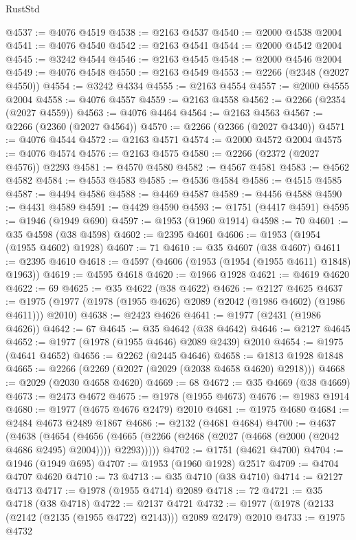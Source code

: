 \begin{lexlean}{RustStd}
\begin{coremodule}
{\begin{coremodule}
{{{{{{{{{{{{{{{{{{{{{{{{{{{{{{{@4537 := @4076 @4519
@4538 := @2163 @4537
@4540 := @2000 @4538 @2004
@4541 := @4076 @4540
@4542 := @2163 @4541
@4544 := @2000 @4542 @2004
@4545 := @3242 @4544
@4546 := @2163 @4545
@4548 := @2000 @4546 @2004
@4549 := @4076 @4548
@4550 := @2163 @4549
@4553 := @2266 (@2348 (@2027 @4550))
@4554 := @3242 @4334
@4555 := @2163 @4554
@4557 := @2000 @4555 @2004
@4558 := @4076 @4557
@4559 := @2163 @4558
@4562 := @2266 (@2354 (@2027 @4559))
@4563 := @4076 @4464
@4564 := @2163 @4563
@4567 := @2266 (@2360 (@2027 @4564))
@4570 := @2266 (@2366 (@2027 @4340))
@4571 := @4076 @4544
@4572 := @2163 @4571
@4574 := @2000 @4572 @2004
@4575 := @4076 @4574
@4576 := @2163 @4575
@4580 := @2266 (@2372 (@2027 @4576)) @2293
@4581 := @4570 @4580
@4582 := @4567 @4581
@4583 := @4562 @4582
@4584 := @4553 @4583
@4585 := @4536 @4584
@4586 := @4515 @4585
@4587 := @4494 @4586
@4588 := @4469 @4587
@4589 := @4456 @4588
@4590 := @4431 @4589
@4591 := @4429 @4590
@4593 := @1751 (@4417 @4591)
@4595 := @1946 (@1949 @690)
@4597 := @1953 (@1960 @1914)
@4598 := 70
@4601 := @35 @4598 (@38 @4598)
@4602 := @2395 @4601
@4606 := @1953 (@1954 (@1955 @4602) @1928)
@4607 := 71
@4610 := @35 @4607 (@38 @4607)
@4611 := @2395 @4610
@4618 := @4597 (@4606 (@1953 (@1954 (@1955 @4611) @1848) @1963))
@4619 := @4595 @4618
@4620 := @1966 @1928
@4621 := @4619 @4620
@4622 := 69
@4625 := @35 @4622 (@38 @4622)
@4626 := @2127 @4625
@4637 := @1975 (@1977 (@1978 (@1955 @4626) @2089 (@2042 (@1986 @4602) (@1986 @4611))) @2010)
@4638 := @2423 @4626
@4641 := @1977 (@2431 (@1986 @4626))
@4642 := 67
@4645 := @35 @4642 (@38 @4642)
@4646 := @2127 @4645
@4652 := @1977 (@1978 (@1955 @4646) @2089 @2439) @2010
@4654 := @1975 (@4641 @4652)
@4656 := @2262 (@2445 @4646)
@4658 := @1813 @1928 @1848
@4665 := @2266 (@2269 (@2027 (@2029 (@2038 @4658 @4620) @2918)))
@4668 := @2029 (@2030 @4658 @4620)
@4669 := 68
@4672 := @35 @4669 (@38 @4669)
@4673 := @2473 @4672
@4675 := @1978 (@1955 @4673)
@4676 := @1983 @1914
@4680 := @1977 (@4675 @4676 @2479) @2010
@4681 := @1975 @4680
@4684 := @2484 @4673 @2489 @1867
@4686 := @2132 (@4681 @4684)
@4700 := @4637
    (@4638
      (@4654
        (@4656 (@4665 (@2266 (@2468 (@2027 (@4668 (@2000 (@2042 @4686 @2495) @2004)))) @2293)))))
@4702 := @1751 (@4621 @4700)
@4704 := @1946 (@1949 @695)
@4707 := @1953 (@1960 @1928) @2517
@4709 := @4704 @4707 @4620
@4710 := 73
@4713 := @35 @4710 (@38 @4710)
@4714 := @2127 @4713
@4717 := @1978 (@1955 @4714) @2089
@4718 := 72
@4721 := @35 @4718 (@38 @4718)
@4722 := @2137 @4721
@4732 := @1977 (@1978 (@2133 (@2142 (@2135 (@1955 @4722) @2143))) @2089 @2479) @2010
@4733 := @1975 @4732
}}}}}}}}}}}}}}}}}}}}}}}}}}}}}}}
\end{coremodule}}
\end{coremodule}
\end{lexlean}
